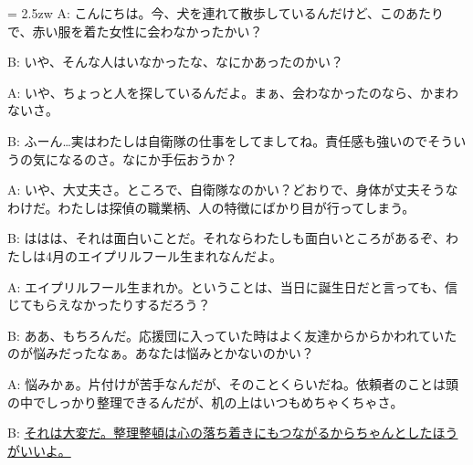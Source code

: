 \documentclass[11pt]{amsart}
\title{}
\author{}
\newenvironment{hangall}[1]{\hangindent = 2.5zw\everypar{\hangindent = 2.5zw}}{}
\begin{document}
\maketitle
\begin{hangall}{}%
A: こんにちは。今、犬を連れて散歩しているんだけど、このあたりで、赤い服を着た女性に会わなかったかい？

B: いや、そんな人はいなかったな、なにかあったのかい？

A: いや、ちょっと人を探しているんだよ。まぁ、会わなかったのなら、かまわないさ。

B: ふーん…実はわたしは自衛隊の仕事をしてましてね。責任感も強いのでそういうの気になるのさ。なにか手伝おうか？

A: いや、大丈夫さ。ところで、自衛隊なのかい？どおりで、身体が丈夫そうなわけだ。わたしは探偵の職業柄、人の特徴にばかり目が行ってしまう。

B: ははは、それは面白いことだ。それならわたしも面白いところがあるぞ、わたしは4月のエイプリルフール生まれなんだよ。

A: エイプリルフール生まれか。ということは、当日に誕生日だと言っても、信じてもらえなかったりするだろう？

B: ああ、もちろんだ。応援団に入っていた時はよく友達からからかわれていたのが悩みだったなぁ。あなたは悩みとかないのかい？

A: 悩みかぁ。片付けが苦手なんだが、そのことくらいだね。依頼者のことは頭の中でしっかり整理できるんだが、机の上はいつもめちゃくちゃさ。

B: \ul{それは大変だ。整理整頓は心の落ち着きにもつながるからちゃんとしたほうがいいよ。}\end{hangall}
\end{document}
